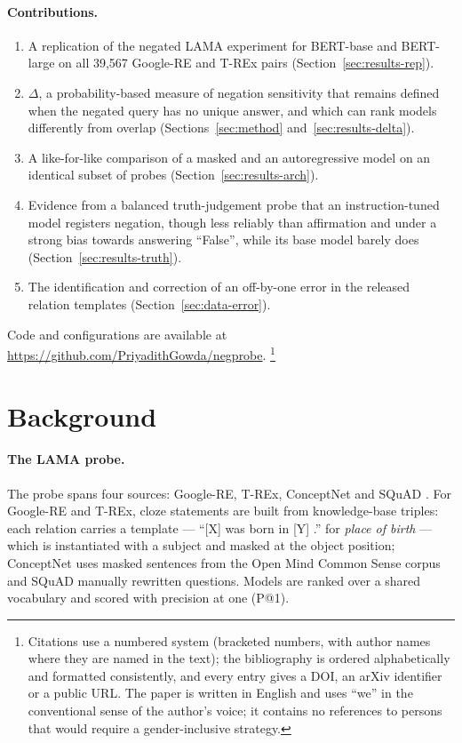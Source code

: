 \documentclass{article}
\begin{document}
\paragraph{Contributions.}
\begin{enumerate}
  \item A replication of the negated LAMA experiment for BERT-base and BERT-large on all 39{,}567
  Google-RE and T-REx pairs (Section~\ref{sec:results-rep}).
  \item $\Delta$, a probability-based measure of negation sensitivity that remains defined when the
  negated query has no unique answer, and which can rank models differently from overlap
  (Sections~\ref{sec:method} and~\ref{sec:results-delta}).
  \item A like-for-like comparison of a masked and an autoregressive model on an identical subset of
  probes (Section~\ref{sec:results-arch}).
  \item Evidence from a balanced truth-judgement probe that an instruction-tuned model registers negation, though less reliably than affirmation and under a strong bias towards answering ``False'', while its base model barely does (Section~\ref{sec:results-truth}).
  \item The identification and correction of an off-by-one error in the released relation templates
  (Section~\ref{sec:data-error}).
\end{enumerate}

Code and configurations are available at \url{https://github.com/PriyadithGowda/negprobe}.%
\footnote{Citations use a numbered system (bracketed numbers, with author names where they are
named in the text); the bibliography is ordered alphabetically and formatted consistently, and every entry gives a DOI, an arXiv identifier or a public URL. The paper is written in
English and uses ``we'' in the conventional sense of the author's voice; it contains no references to
persons that would require a gender-inclusive strategy.}

\section{Background}
\label{sec:background}

\paragraph{The LAMA probe.} The probe spans four sources: Google-RE, T-REx, ConceptNet and SQuAD \citep{petroni2019}. For Google-RE and T-REx, cloze statements are built from knowledge-base triples: each relation carries a template --- ``[X] was born in [Y] .'' for \textit{place of birth} --- which is instantiated with a subject and masked at the object position; ConceptNet uses masked sentences from the Open Mind Common Sense corpus and SQuAD manually rewritten questions. Models are ranked over a shared vocabulary and scored with precision at one (P@1).
\end{document}
